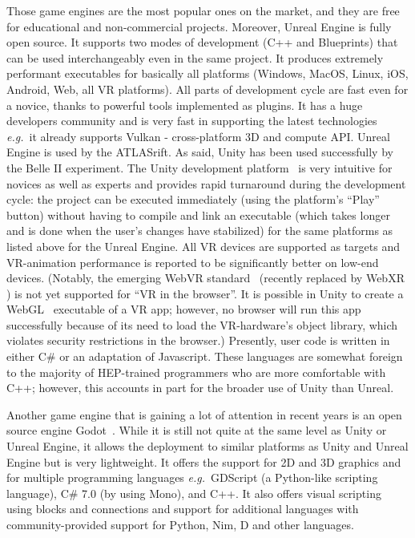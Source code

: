 \documentclass[12pt,a4paper]{article}
\begin{document}
Those game engines are the most popular ones on the market, and they are free for educational and non-commercial projects.
Moreover, Unreal Engine is fully open source. It supports two modes of development (C++ and Blueprints) that can be used interchangeably even in the same project. It produces extremely performant executables for basically all platforms (Windows, MacOS, Linux, iOS, Android, Web, all VR platforms). All parts of development cycle are fast even for a novice,
thanks to powerful tools implemented as plugins. It has a huge developers community and is very fast in supporting the latest technologies {\it e.g.}\ it already supports Vulkan - cross-platform 3D and compute API. Unreal Engine is used by the ATLASrift.
As said, Unity has been used successfully by the Belle II experiment. The Unity development platform~\cite{Unity3D} is very intuitive for novices as well as experts and provides rapid turnaround during the development cycle: the project can be executed immediately (using the platform’s ``Play'' button) without having to compile and link an executable (which takes longer and is done when the user’s changes have stabilized) for the same platforms as listed above for the Unreal Engine.
All VR devices are supported as targets and VR-animation performance is reported to be significantly better on low-end devices.
(Notably, the emerging WebVR standard~\cite{WebVR} (recently replaced by WebXR \cite{WebXR}) is not yet supported for ``VR in the browser''. It is possible in Unity to create a
WebGL~\cite{WebGL2011} executable of a VR app; however, no browser will run this app successfully because of its need to load the
VR-hardware’s object library, which violates security restrictions in the browser.) Presently, user code is written in either
C\# or an adaptation of Javascript. These languages are somewhat foreign to the majority of HEP-trained programmers who are more comfortable with
C++; however, this accounts in part for the broader use of Unity than Unreal.

Another game engine that is gaining a lot of attention in recent years is an open source engine Godot~\cite{Godot}. 
While it is still not quite at the same level as Unity or Unreal Engine, it allows the deployment to similar platforms as Unity and Unreal Engine but is very lightweight. 
It offers the support for 2D and 3D graphics and for multiple programming languages {\it e.g.}\ GDScript (a Python-like scripting language), C\# 7.0 (by using Mono), and C++. 
It also offers visual scripting using blocks and connections and support for additional languages with community-provided support for Python, Nim, D and other languages.
\end{document}
